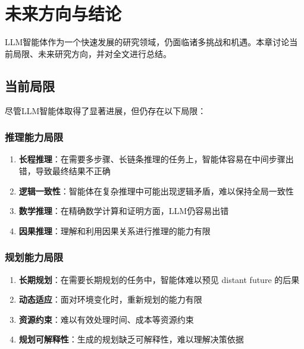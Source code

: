 \section{未来方向与结论}\label{sec:future}

LLM智能体作为一个快速发展的研究领域，仍面临诸多挑战和机遇。本章讨论当前局限、未来研究方向，并对全文进行总结。

\subsection{当前局限}

尽管LLM智能体取得了显著进展，但仍存在以下局限：

\subsubsection{推理能力局限}

\begin{enumerate}[leftmargin=2em]
    \item \textbf{长程推理}：在需要多步骤、长链条推理的任务上，智能体容易在中间步骤出错，导致最终结果不正确
    
    \item \textbf{逻辑一致性}：智能体在复杂推理中可能出现逻辑矛盾，难以保持全局一致性
    
    \item \textbf{数学推理}：在精确数学计算和证明方面，LLM仍容易出错
    
    \item \textbf{因果推理}：理解和利用因果关系进行推理的能力有限
\end{enumerate}

\subsubsection{规划能力局限}

\begin{enumerate}[leftmargin=2em]
    \item \textbf{长期规划}：在需要长期规划的任务中，智能体难以预见 distant future 的后果
    
    \item \textbf{动态适应}：面对环境变化时，重新规划的能力有限
    
    \item \textbf{资源约束}：难以有效处理时间、成本等资源约束
    
    \item \textbf{规划可解释性}：生成的规划缺乏可解释性，难以理解决策依据
\end{enumerate}

